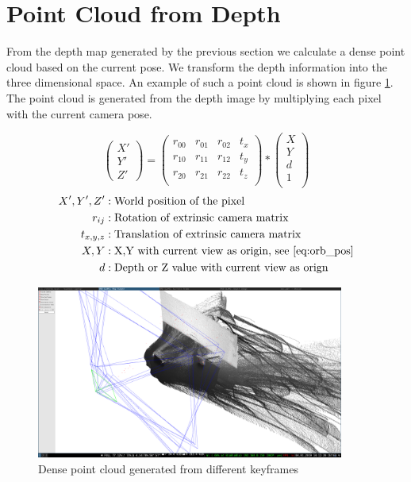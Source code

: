 \documentclass[11pt,a4paper,titlepage,oneside]{report}
\begin{document}
\section{Point Cloud from Depth}

From the depth map generated by the previous section we calculate a dense point cloud based on the current pose. We transform the depth information into the three dimensional space. An example of such a point cloud is shown in figure \ref{fig:pointcloud}. The point cloud is generated from the depth image by multiplying each pixel with the current camera pose.

\begin{equation}\label{eq:point_cloud_depth}
	\begin{pmatrix}
			X' \\
			Y' \\
			Z'
	\end{pmatrix}=
	\begin{pmatrix}
		r_{00} & r_{01} & r_{02} & t_x \\
		r_{10} & r_{11} & r_{12} & t_y \\
		r_{20} & r_{21} & r_{22} & t_z \\
	\end{pmatrix}*
	\begin{pmatrix}
		X\\
		Y\\
		d\\
		1\\
	\end{pmatrix}
\end{equation}
\begin{align*}
	X',Y',Z' &:		\text{World position of the pixel}\\
	r_{ij} &:			\text{Rotation of extrinsic camera matrix}\\
	t_{x,y,z} &:	\text{Translation of extrinsic camera matrix}\\
	X,Y &:				\text{X,Y with current view as origin, see \ref{eq:orb_pos}}\\
	d &:					\text{Depth or Z value with current view as orign}
\end{align*}

\begin{figure}[H]
  \begin{center}
		\includegraphics[width=0.9\textwidth]{img/pointcloud.png}
  \end{center}
	\caption{Dense point cloud generated from different keyframes}\label{fig:pointcloud}
\end{figure}
\end{document}
